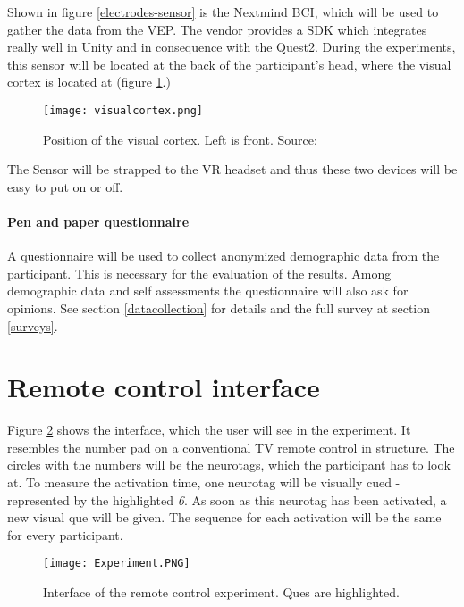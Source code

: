                 Shown in figure \ref*{electrodes-sensor} is the Nextmind BCI, which will be used to gather the data from the VEP. The vendor provides a SDK which integrates really well in Unity and in consequence with the Quest2. During the experiments, this sensor will be located at the back of the participant's head, where the visual cortex is located at (figure \ref*{visual-cortex}.)

                \begin{figure}[h]     %
                    \centering
                    \texttt{[image: visualcortex.png]} 
                    \caption{Position of the visual cortex. Left is front. Source: \cite{Dr.KenBrodaBahm.2013}}\label{visual-cortex}
                \end{figure}

                The Sensor will be strapped to the VR headset and thus these two devices will be easy to put on or off.

            \paragraph{Pen and paper questionnaire}

                A questionnaire will be used to collect anonymized demographic data from the participant. This is necessary for the evaluation of the results. Among demographic data and self assessments the questionnaire will also ask for opinions. See section \ref*{datacollection} for details and the full survey at section \ref*{surveys}.

        \section{Remote control interface}
        
            Figure \ref*{gui-remote} shows the interface, which the user will see in the experiment. It resembles the number pad on a conventional TV remote control in structure. The circles with the numbers will be the neurotags, which the participant has to look at. To measure the activation time, one neurotag will be visually cued - represented by the highlighted \textit{6}. As soon as this neurotag has been activated, a new visual que will be given. The sequence for each activation will be the same for every participant. 
            
            \begin{figure}[h]     %
                \centering
                \texttt{[image: Experiment.PNG]} 
                \caption{Interface of the remote control experiment. Ques are highlighted.}\label{gui-remote}
            \end{figure} 
            
